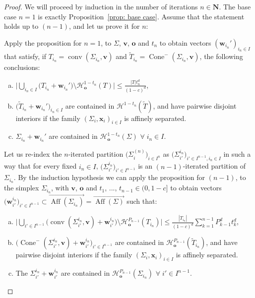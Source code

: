 \documentclass[10pt]{amsart}
\newcommand{\N}{\mathbf{N}}
\newcommand{\conv}{\operatorname{conv}}
\newcommand{\ocone}[2]{\operatorname{Cone}^-(#1,#2)}
\begin{document}
\begin{proof}
   We will proceed by induction in the number of iterations $n\in \N$. The base case $n=1$ is exactly Proposition~\ref{prop: base case}. Assume that the statement holds up to $(n-1)$, and let us prove it for $n$:
   
  Apply the proposition for $n=1$, to $\Sigma$, $\mathbf{v}$, $\mathbf{o}$ and $t_n$ to obtain vectors $(\mathbf{w}_{i_n}')_{i_{n}\in I}$ that satisfy, if  $T_{i_n} = \conv(\Sigma_{i_n},\mathbf{v})$ and $\widetilde{T}_{i_n}=\ocone{\Sigma_{i_n}}{ \mathbf{v}}$, the following conclusions:
\begin{enumerate}[(a)]
    \item\label{item:induction11} $\displaystyle \bigg|\bigcup_{i_n\in I} \bigg(T_{i_n}+\mathbf{w}_{i_n}'\bigg)\setminus \mathcal{H}_\mathbf{o}^{1-t_n}(T)\bigg|\leq \frac{|T|t_n^d}{(1-c)^d}$,
    \item\label{item:induction12} $\displaystyle \big(\widetilde{T}_{i_n}+\mathbf{w}_{i_n}'\big)_{i_n\in I}$ are contained in $\mathcal{H}^{1-t_n}(\widetilde{T})$, and have pairwise disjoint interiors if the family $(\Sigma_i,\mathbf{x}_i)_{i \in I}$ is affinely separated.
    \item\label{item:induction13} $\Sigma_{i_n}+\mathbf{w}_{i_n}'$ are contained in $\mathcal{H}^{1-t_n}_\mathbf{o}(\Sigma)$ $\forall \;i_n\in I$.
\end{enumerate} 

Let us re-index the $n$-iterated partition $\big(\Sigma_i^{(n)}\big)_{i \in I^n}$ as $\big(\Sigma_{i'}^{i_n}\big)_{i'\in I^{n-1},i_n \in I}$ in such a way that for every fixed $i_{n}\in I$, $\big(\Sigma_{i'}^{i_n}\big)_{i'\in I^{n-1}}$ is an $(n-1)$-iterated partition of $\Sigma_{i_n}$. By the induction hypothesis we can apply the proposition for $(n-1)$, to the simplex $\Sigma_{i_{n}}$, with $\mathbf{v}$, $\mathbf{o}$ and $t_1$, ..., $t_{n-1}\in (0,1-c]$ to obtain vectors $\big(\mathbf{w}_{i'}^{i_n}\big)_{i'\in I^{n-1}}\subset \overrightarrow{\operatorname{Aff}(\Sigma_{i_n})}=\overrightarrow{\operatorname{Aff}(\Sigma)}$ such that:
\begin{enumerate}[(a),resume]
    \item\label{item:inductionn1} $\displaystyle \bigg|\bigcup_{i'\in I^{n-1}} \bigg(\operatorname{conv}(\Sigma_{i'}^{i_n}, \mathbf{v})+\mathbf{w}_{i'}^{i_n}\bigg)\setminus \mathcal{H}_\mathbf{o}^{P_{n-1}}(T_{i_n})\bigg|\leq \frac{|T_{i_n}|}{(1-c)^d}\sum_{k=1}^{n-1} P_{k-1}^dt_k^d$,
    \item\label{item:inductionn2} $\displaystyle \big(\ocone{\Sigma^{i_n}_{i'}}{ \mathbf{v}}+\mathbf{w}^{i_n}_{i'}\big)_{i'\in I^{n-1}}$ are contained in $\mathcal{H}^{P_{n-1}}_\mathbf{o}(\widetilde{T}_{i_n})$, and have pairwise disjoint interiors if the family $(\Sigma_i,\mathbf{x}_i)_{i \in I}$ is affinely separated.
    \item\label{item:inductionn3} The $\Sigma_{i'}^{i_n}+
    \mathbf{w}^{i_n}_{i'}$ are contained in $\mathcal{H}^{P_{n-1}}_\mathbf{o}(\Sigma_{i_n})$ $\forall \;i'\in I^{n-1}$.
\end{enumerate}


\end{proof}
\end{document}

